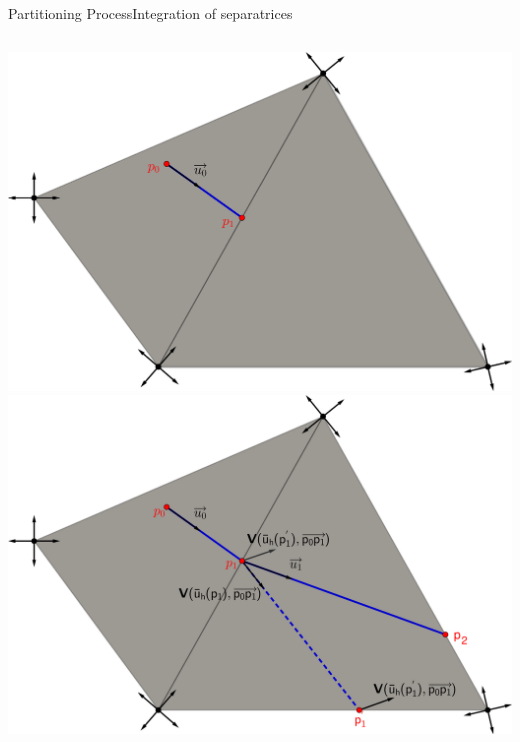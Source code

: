 \documentclass[compress,10pt,aspectratio=169]{beamer}
\begin{document}
\begin{frame}{Partitioning Process}{Integration of separatrices}
\small
\begin{columns}
\begin{column}{0.5\textwidth}
\centering
\vspace{-0.3cm}
\includegraphics[scale=0.1]{images/draw_streams_11.pdf}\\\vspace{0.2cm}
\includegraphics[scale=0.1]{images/draw_streams_12.pdf}\\\vspace{0.3cm}
\end{column}


\end{columns}
\end{frame}
\end{document}
